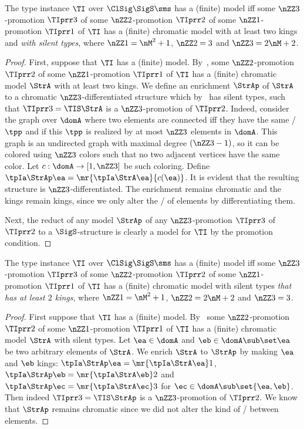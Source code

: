 \begin{remark}\label{rem:prop-silent}
The type instance $\TI$ over $\ClSig\SigS\sms$ has a (finite) model
iff some $\nZZ3$-promotion $\TIprr3$
of some $\nZZ2$-promotion $\TIprr2$ 
of some $\nZZ1$-promotion $\TIprr1$ 
of $\TI$ has a (finite) chromatic model with at least two kings and
\emph{with silent types},
where $\nZZ1 = \nM^2+1$, $\nZZ2 = 3$ and $\nZZ3 = 2\nM+2$.
\end{remark}
\begin{proof}
First, suppose that $\TI$ has a (finite) model.
By~, some
$\nZZ2$-promotion $\TIprr2$
of some $\nZZ1$-promotion $\TIprr1$ of $\TI$ has a (finite) chromatic model
$\StrA$ with at least two kings.
We define an enrichment $\StrAp$ of $\StrA$ to a chromatic
$\nZZ3$-differentiated structure which by~ has silent types,
such that $\TIprr3 = \TIS\StrA$ is a $\nZZ3$-promotion of $\TIprr2$.
Indeed, consider the graph over $\domA$ where two elements are connected iff
they have the same \onetype/ $\tpp$ and if this $\tpp$ is realized by at most
$\nZZ3$ elements in $\domA$.
This graph is an undirected graph with maximal degree $(\nZZ3-1)$, so it can be
colored using $\nZZ3$ colors such that no two adjacent vertices have the same
color.
Let $c : \domA\to[1,\nZZ3]$ be such coloring.
Define $\tpIa\StrAp\ea = \mr{\tpIa\StrA\ea}{c(\ea)}$.
It is evident that the resulting structure is $\nZZ3$-differentiated.
The enrichment remains chromatic and the kings remain kings,
since we only alter the \onetypes/ of elements by differentiating them.

 Next, the reduct of any model $\StrAp$ of any $\nZZ3$-promotion $\TIprr3$ of
$\TIprr2$ to a $\SigS$-structure is clearly a model for $\TI$ by the promotion
condition.
\end{proof}

\begin{remark}\label{rem:prop-twokings}
The type instance $\TI$ over $\ClSig\SigS\sms$ has a (finite) model
iff some $\nZZ3$-promotion $\TIprr3$
of some $\nZZ2$-promotion $\TIprr2$
of some $\nZZ1$-promotion $\TIprr1$ 
of $\TI$ has a (finite) chromatic model with silent types
\emph{that has at least $2$ kings},
where $\nZZ1 = \nM^2+1$, $\nZZ2 = 2\nM+2$ and $\nZZ3 = 3$.
\end{remark}
\begin{proof}
First suppose that $\TI$ has a (finite) model.
By~
some $\nZZ2$-promotion $\TIprr2$
of some $\nZZ1$-promotion $\TIprr1$
of $\TI$ has a (finite) chromatic model $\StrA$ with silent types.
Let $\ea\in\domA$ and $\eb\in\domA\sub\set\ea$ be two arbitrary elements of
$\StrA$. We enrich $\StrA$ to $\StrAp$ by making $\ea$ and $\eb$ kings:
$\tpIa\StrAp\ea = \mr{\tpIa\StrA\ea}1$,
$\tpIa\StrAp\eb = \mr{\tpIa\StrA\eb}2$
and $\tpIa\StrAp\ec = \mr{\tpIa\StrA\ec}3$ for $\ec\in\domA\sub\set{\ea,\eb}$.
Then indeed $\TIprr3 = \TIS\StrAp$ is a $\nZZ3$-promotion of $\TIprr2$.
We know that $\StrAp$ remains chromatic since we did not alter the kind of
\twotypes/ between elements.
\end{proof}

